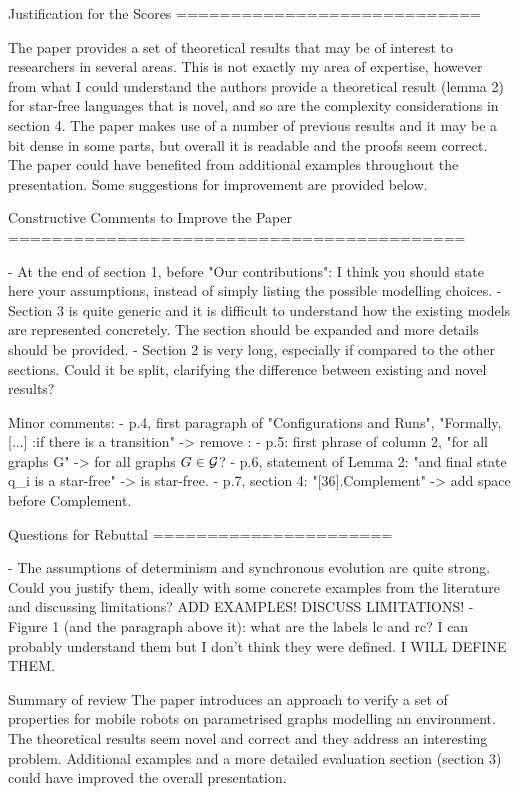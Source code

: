 Justification for the Scores
============================

The paper provides a set of theoretical results that may be of interest to researchers in several areas. This is not exactly my area of expertise, however from what I could understand the authors provide a theoretical result (lemma 2) for star-free languages that is novel, and so are the complexity considerations in section 4. The paper makes use of a number of previous results and it may be a bit dense in some parts, but overall it is readable and the proofs seem correct. The paper could have benefited from additional examples throughout the presentation. Some suggestions for improvement are provided below.

Constructive Comments to Improve the Paper
==========================================

- At the end of section 1, before "Our contributions": I think you should state here your assumptions, instead of simply listing the possible modelling choices.
- Section 3 is quite generic and it is difficult to understand how the existing models are represented concretely. The section should be expanded and more details should be provided.
- Section 2 is very long, especially if compared to the other sections. Could it be split, clarifying the difference between existing and novel results?

Minor comments:
- p.4, first paragraph of "Configurations and Runs", "Formally, [...] :if there is a transition" -> remove :
- p.5: first phrase of column 2, "for all graphs G" -> for all graphs $G \in \cal{G}$?
- p.6, statement of Lemma 2: "and final state q_i is a star-free" -> is star-free.
- p.7, section 4: "[36].Complement" -> add space before Complement.


Questions for Rebuttal
======================

- The assumptions of determinism and synchronous evolution are quite strong. Could you justify them, ideally with some concrete examples from the literature and discussing limitations?
ADD EXAMPLES! DISCUSS LIMITATIONS!
- Figure 1 (and the paragraph above it): what are the labels lc and rc? I can probably understand them but I don't think they were defined.
I WILL DEFINE THEM.

Summary of review
The paper introduces an approach to verify a set of properties for mobile robots on parametrised graphs modelling an environment. The theoretical results seem novel and correct and they address an interesting problem. Additional examples and a more detailed evaluation section (section 3) could have improved the overall presentation.






